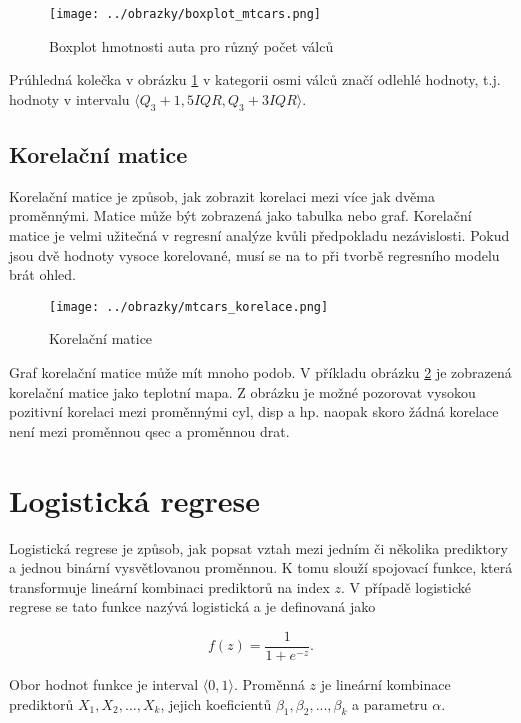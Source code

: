 \begin{figure}[H]
    \centering
    \texttt{[image: ../obrazky/boxplot\_mtcars.png]}
    \caption{Boxplot hmotnosti auta pro různý počet válců} 
    \label{fig:boxplot_mtcars}
\end{figure}

Prúhledná kolečka v obrázku \ref{fig:boxplot_mtcars} v kategorii osmi válců značí odlehlé hodnoty, t.j. hodnoty
v intervalu $\langle Q_3 + 1,5IQR, Q_3 + 3IQR \rangle$.

{\color{red}
\subsection{Korelační matice}
Korelační matice je způsob, jak zobrazit korelaci mezi více jak dvěma proměnnými. Matice může být zobrazená jako tabulka nebo
graf. Korelační matice je velmi užitečná v regresní analýze kvůli předpokladu nezávislosti. Pokud jsou dvě hodnoty vysoce korelované,
musí se na to při tvorbě regresního modelu brát ohled.

\begin{figure}[H]
    \centering
    \texttt{[image: ../obrazky/mtcars\_korelace.png]}
    \caption{Korelační matice} 
    \label{fig:mtcars_korelace}
\end{figure}

Graf korelační matice může mít mnoho podob. V příkladu obrázku \ref{fig:mtcars_korelace} je zobrazená korelační matice jako teplotní mapa. Z obrázku je možné pozorovat vysokou
pozitivní korelaci mezi proměnnými cyl, disp a hp. naopak skoro žádná korelace není mezi proměnnou qsec a proměnnou drat.
}

\newpage
\section{Logistická regrese}
Logistická regrese je způsob, jak popsat vztah mezi jedním či několika prediktory a jednou binární vysvětlovanou 
proměnnou. K tomu slouží spojovací funkce, která transformuje lineární kombinaci prediktorů na index $z$. V případě
logistické regrese se tato funkce nazývá logistická a je definovaná jako

\begin{equation}
    \label{eq:logisticka_funkce}
    f(z) = \frac{1}{1 + e^{-z}}.
\end{equation}

Obor hodnot funkce je interval $\langle 0, 1 \rangle$. Proměnná $z$ je lineární kombinace prediktorů  $X_1, X_2, ..., X_k$, 
jejich koeficientů $\beta_1, \beta_2, ..., \beta_k$ a parametru $\alpha$.

